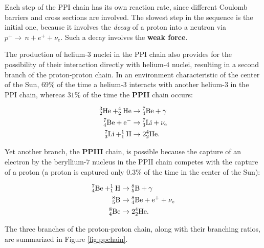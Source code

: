\documentclass[a4paper,10pt]{article}
\begin{document}
{\noindent}Each step of the PPI chain has its own reaction rate, since different Coulomb barriers and cross sections are involved. The slowest step in the sequence is the initial one, because it involves the \textit{decay} of a proton into a neutron via $p^+\rightarrow\,n+e^++\nu_e$. Such a decay involves the \textbf{weak force}.

{\noindent}The production of helium-$3$ nuclei in the PPI chain also provides for the possibility of their interaction directly with helium-$4$ nuclei, resulting in a second branch of the proton-proton chain. In an environment characteristic of the center of the Sun, $69\%$ of the time a helium-$3$ interacts with another helium-$3$ in the PPI chain, whereas $31\%$ of the time the \textbf{PPII} chain occurs:

\begin{align*}
    {\rm ^3_2He + ^4_2He} &\rightarrow {\rm ^7_4Be + \gamma} \\
    {\rm ^7_4Be + e^-} &\rightarrow {\rm ^7_3Li + \nu_e} \\
    {\rm ^7_3Li + ^1_1H} &\rightarrow {\rm 2^4_2He}.
\end{align*}

{\noindent}Yet another branch, the \textbf{PPIII} chain, is possible because the capture of an electron by the beryllium-$7$ nucleus in the PPII chain competes with the capture of a proton (a proton is captured only $0.3\%$ of the time in the center of the Sun):

\begin{align*}
    {\rm ^7_4Be + ^1_1H} &\rightarrow {\rm ^8_5B + \gamma} \\
    {\rm ^8_5B} &\rightarrow {\rm ^8_4Be + e^+ + \nu_e} \\
    {\rm ^8_4Be} &\rightarrow {\rm 2^4_2He}.
\end{align*}

{\noindent}The three branches of the proton-proton chain, along with their branching ratios, are summarized in Figure \ref{fig:ppchain}.
\end{document}
